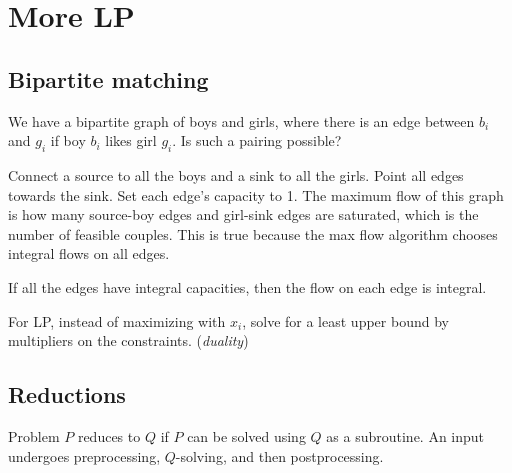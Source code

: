\chapter{More LP}
%	

\section{Bipartite matching}
We have a bipartite graph of boys and girls, where there is an edge between \(b_i\) and \(g_i\) if boy \(b_i\) likes girl \(g_i\).
Is such a pairing possible?

Connect a  source to all the boys and a sink to all the girls. Point all edges towards the sink. Set each edge's capacity to 1.
The maximum flow of this graph is how many source-boy edges and girl-sink edges are saturated, which is the number of feasible couples.
This is true because the max flow algorithm chooses integral flows on all edges.

\begin{theorem}
	If all the edges have integral capacities, then the flow on each edge is integral.
\end{theorem}

For LP, instead of maximizing with \(x_i\), solve for a least upper bound by multipliers on the constraints. (\emph{duality})

\section{Reductions}
Problem \(P\) reduces to \(Q\) if \(P\) can be solved using \(Q\) as a subroutine. An input undergoes preprocessing, \(Q\)-solving, and then postprocessing.

